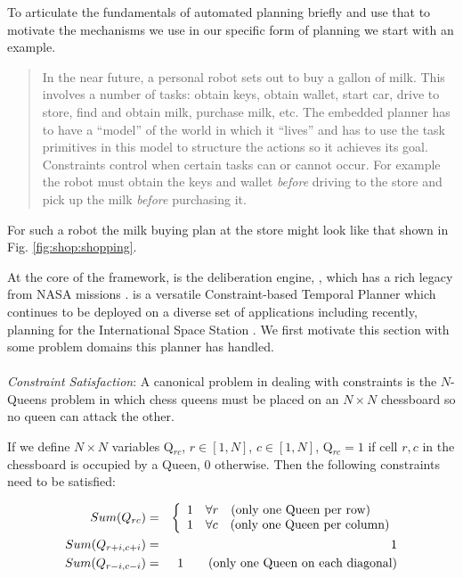 To articulate the fundamentals of automated planning briefly and use
that to motivate the mechanisms we use in our specific form of
planning we start with an example.

{\small
  \begin{quote}
    In the near future, a personal robot sets out to buy a gallon of
    milk. This involves a number of tasks: obtain keys, obtain wallet,
    start car, drive to store, find and obtain milk, purchase milk,
    etc.  The embedded planner has to have a ``model'' of the world in
    which it ``lives'' and has to use the task primitives in this
    model to structure the actions so it achieves its
    goal. Constraints control when certain tasks can or cannot
    occur. For example the robot must obtain the keys and wallet
    \emph{before} driving to the store and pick up the milk
    \emph{before} purchasing it.
\end{quote}

For such a robot the milk buying plan at the store might look like
that shown in Fig. \ref{fig:shop:shopping}.

At the core of the \rx framework, is the deliberation engine, \eue,
which has a rich legacy from NASA missions \cite{mus98,rajan00,
  jonsson00,aichang04, bresina05}. \eu is a versatile Constraint-based
Temporal Planner which continues to be deployed on a diverse set of
applications including recently, planning for the International Space
Station \cite{barreiro09}. We first motivate this section with some
problem domains this planner has handled.

\paragraph{} {\em Constraint Satisfaction}: A canonical problem in
dealing with constraints is the $N$-Queens problem in which chess
queens must be placed on an $N \times N$ chessboard so no queen can
attack the other. 

If we define $N \times N$ variables Q$_{rc}$, $r \in [1,N]$, $c \in
[1,N]$, Q$_{rc} = 1$ if cell $r,c$ in the chessboard is occupied by a
Queen, $0$ otherwise. Then the following constraints need to be
satisfied:

\begin{eqnarray*}
 Sum(Q_{rc}) & = & \left\{
   \begin{array}{l l}
     1 & \forall r \quad \mbox{(only one Queen per row)}\\
     1 & \forall c \quad \mbox{(only one Queen per column)}\\ 
   \end{array} \right. \\
Sum(Q_{r+i,c+i}) & = & 1\\
Sum(Q_{r-i,c-i}) & = & 1 \qquad \mbox{(only one Queen on each diagonal)}\\
\end{eqnarray*} 

}
